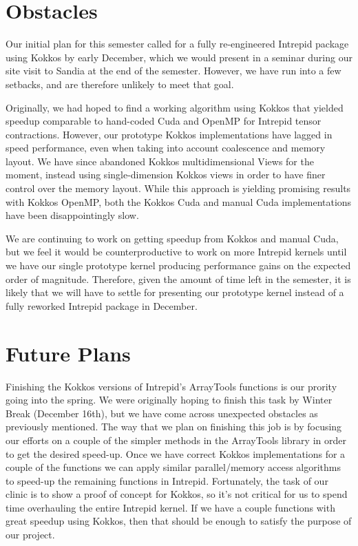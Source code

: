 \documentclass{hmcclinic}
\begin{document}
\section*{Obstacles}
Our initial plan for this semester called for a fully re-engineered Intrepid
package using Kokkos by early December, which we would present in a seminar
during our site visit to Sandia at the end of the semester.  However, we have
run into a few setbacks, and are therefore unlikely to meet that goal.

Originally, we had hoped to find a working algorithm using Kokkos that yielded
speedup comparable to hand-coded Cuda and OpenMP for Intrepid tensor
contractions.  However, our prototype Kokkos implementations have lagged in
speed performance, even when taking into account coalescence and memory layout.
We have since abandoned Kokkos multidimensional Views for the moment, instead
using single-dimension Kokkos views in order to have finer control over the
memory layout.  While this approach is yielding promising results with Kokkos
OpenMP, both the Kokkos Cuda and manual Cuda implementations have been
disappointingly slow.

We are continuing to work on getting speedup from Kokkos and manual Cuda, but we
feel it would be counterproductive to work on more Intrepid kernels until we
have our single prototype kernel producing performance gains on the expected
order of magnitude.  Therefore, given the amount of time left in the semester,
it is likely that we will have to settle for presenting our prototype kernel
instead of a fully reworked Intrepid package in December. 

\section*{Future Plans}
Finishing the Kokkos versions of Intrepid's ArrayTools functions is our prority
going into the spring.  We were originally hoping to finish this task by Winter
Break (December 16th), but we have come across unexpected obstacles as
previously mentioned. The way that we plan on finishing this job is by focusing
our efforts on a couple of the simpler methods in the ArrayTools library in
order to get the desired speed-up. Once we have correct Kokkos implementations
for a couple of the functions we can apply similar parallel/memory access
algorithms to speed-up the remaining functions in Intrepid. Fortunately, the
task of our clinic is to show a proof of concept for Kokkos, so it's not
critical for us to spend time overhauling the entire Intrepid kernel.  If we
have a couple functions  with great speedup using Kokkos, then that should be
enough to satisfy the purpose of our project. 
\end{document}
